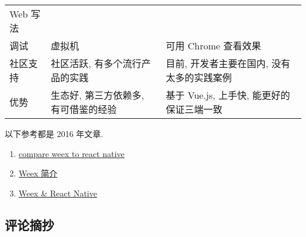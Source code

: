 \begin{longtable}[]{@{}lll@{}}
\begin{minipage}[t]{0.30\columnwidth}
Web 写法\strut
\end{minipage}\tabularnewline
\begin{minipage}[t]{0.30\columnwidth}\raggedright\strut
调试\strut
\end{minipage} & \begin{minipage}[t]{0.30\columnwidth}\raggedright\strut
虚拟机\strut
\end{minipage} & \begin{minipage}[t]{0.30\columnwidth}\raggedright\strut
可用 Chrome 查看效果\strut
\end{minipage}\tabularnewline
\begin{minipage}[t]{0.30\columnwidth}\raggedright\strut
社区支持\strut
\end{minipage} & \begin{minipage}[t]{0.30\columnwidth}\raggedright\strut
社区活跃, 有多个流行产品的实践\strut
\end{minipage} & \begin{minipage}[t]{0.30\columnwidth}\raggedright\strut
目前, 开发者主要在国内, 没有太多的实践案例\strut
\end{minipage}\tabularnewline
\begin{minipage}[t]{0.30\columnwidth}\raggedright\strut
优势\strut
\end{minipage} & \begin{minipage}[t]{0.30\columnwidth}\raggedright\strut
生态好, 第三方依赖多, 有可借鉴的经验\strut
\end{minipage} & \begin{minipage}[t]{0.30\columnwidth}\raggedright\strut
基于 Vue.js, 上手快, 能更好的保证三端一致\strut
\end{minipage}\tabularnewline
\bottomrule
\end{longtable}

以下参考都是 2016 年文章.

\begin{enumerate}
\def\labelenumi{\arabic{enumi}.}
\tightlist
\item
  \href{https://www.gitbook.com/book/xiaomaer/compare-weex-to-react-native/details}{compare
  weex to react native}
\item
  \href{http://slides.com/ciyinhuang/weex\#/}{Weex 简介}
\item
  \href{http://zfx5130.me/blog/2016/09/15/Weex-\&-React-Native/}{Weex \&
  React Native}
\end{enumerate}

\subsection{评论摘抄}\label{ux8bc4ux8bbaux6458ux6284}

